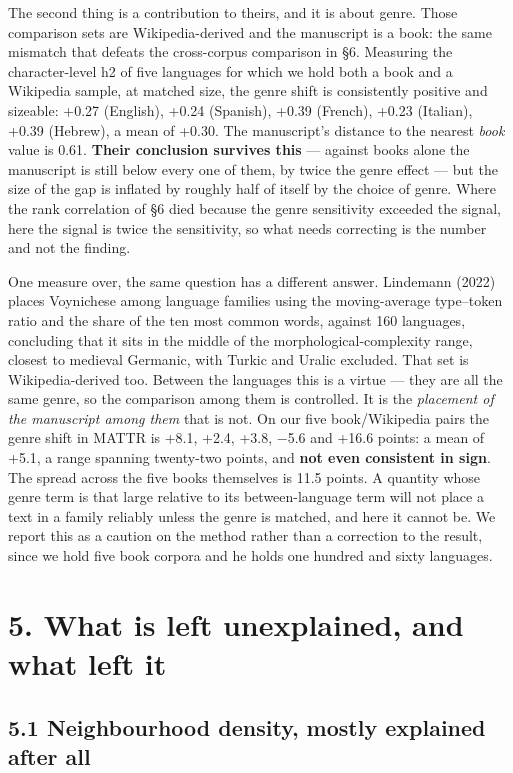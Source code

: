 \documentclass[11pt,a4paper]{article}
\begin{document}
The second thing is a contribution to theirs, and it is about genre. Those comparison sets are Wikipedia-derived and the manuscript is a book: the same mismatch that defeats the cross-corpus comparison in \S6. Measuring the character-level h2 of five languages for which we hold both a book and a Wikipedia sample, at matched size, the genre shift is consistently positive and sizeable: +0.27 (English), +0.24 (Spanish), +0.39 (French), +0.23 (Italian), +0.39 (Hebrew), a mean of +0.30. The manuscript's distance to the nearest \emph{book} value is 0.61. \textbf{Their conclusion survives this} --- against books alone the manuscript is still below every one of them, by twice the genre effect --- but the size of the gap is inflated by roughly half of itself by the choice of genre. Where the rank correlation of \S6 died because the genre sensitivity exceeded the signal, here the signal is twice the sensitivity, so what needs correcting is the number and not the finding.


One measure over, the same question has a different answer. Lindemann (2022) places Voynichese among language families using the moving-average type--token ratio and the share of the ten most common words, against 160 languages, concluding that it sits in the middle of the morphological-complexity range, closest to medieval Germanic, with Turkic and Uralic excluded. That set is Wikipedia-derived too. Between the languages this is a virtue --- they are all the same genre, so the comparison among them is controlled. It is the \emph{placement of the manuscript among them} that is not. On our five book/Wikipedia pairs the genre shift in MATTR is +8.1, +2.4, +3.8, $-$5.6 and +16.6 points: a mean of +5.1, a range spanning twenty-two points, and \textbf{not even consistent in sign}. The spread across the five books themselves is 11.5 points. A quantity whose genre term is that large relative to its between-language term will not place a text in a family reliably unless the genre is matched, and here it cannot be. We report this as a caution on the method rather than a correction to the result, since we hold five book corpora and he holds one hundred and sixty languages.


\section*{5. What is left unexplained, and what left it}


\subsection*{5.1 Neighbourhood density, mostly explained after all}
\end{document}
